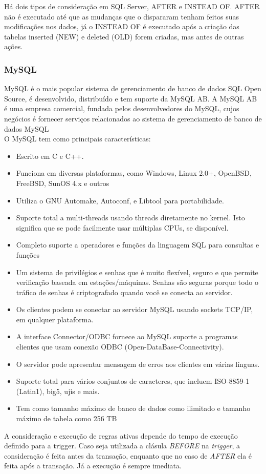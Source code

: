 \documentclass[conference]{IEEEtran}
\begin{document}
	  Há dois tipos de consideração em SQL Server, AFTER e INSTEAD OF. AFTER não é executado até que as mudanças que o dispararam tenham feitos suas modificações nos dados, já o INSTEAD OF é executado após a criação das tabelas inserted (NEW) e deleted (OLD) forem criadas, mas antes de outras ações.\cite{caracteristica-mssql} \cite{caracteristica-mssql2}

    \subsubsection{MySQL}
	  MySQL é o mais popular sistema de gerenciamento de banco de dados SQL Open Source, é desenvolvido, distribuído e tem suporte da MySQL AB. A MySQL AB é uma empresa comercial, fundada pelos desenvolvedores do MySQL, cujos negócios é fornecer serviços relacionados ao sistema de gerenciamento de banco de dados MySQL\cite{mysql-site}\\

	  
    O MySQL tem como principais características:
    \begin{itemize}
    \item Escrito em C e C++.
    \item Funciona em diversas plataformas, como Windows, Linux 2.0+, OpenBSD, FreeBSD, SunOS 4.x e outros
    \item Utiliza o GNU Automake, Autoconf, e Libtool para portabilidade.
    \item Suporte total a multi-threads usando threads diretamente no kernel. Isto significa que se pode facilmente usar múltiplas CPUs, se disponível.
    \item Completo suporte a operadores e funções da linguagem SQL para consultas e funções
    \item Um sistema de privilégios e senhas que é muito flexível, seguro e que permite verificação baseada em estações/máquinas. Senhas são seguras porque todo o tráfico de senhas é criptografado quando você se conecta ao servidor.
    \item Os clientes podem se conectar ao servidor MySQL usando sockets TCP/IP, em qualquer plataforma.
    \item A interface Connector/ODBC fornece ao MySQL suporte a programas clientes que usam conexão ODBC (Open-DataBase-Connectivity). 
    \item O servidor pode apresentar mensagem de erros aos clientes em várias línguas. 
    \item Suporte total para vários conjuntos de caracteres, que incluem ISO-8859-1 (Latin1), big5, ujis e mais.
    \item Tem como tamanho máximo de banco de dados como ilimitado e tamanho máximo de tabela como 256 TB
    \end{itemize}
    A consideração e execução de regras ativas depende do tempo de execução definido para a trigger. Caso seja utilizada a clásula \textit{BEFORE} na \textit{trigger}, a consideração é feita antes da transação, enquanto que no caso de \textit{AFTER} ela é feita após a transação. Já a execução é sempre imediata.\cite{caracteristica-myssql}
\end{document}
